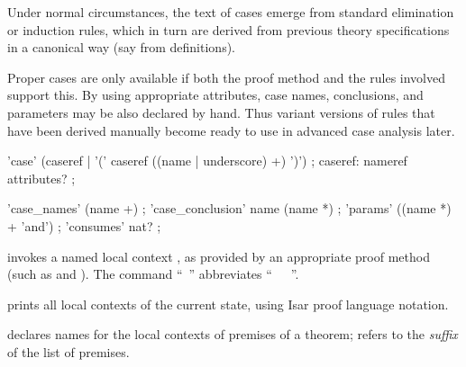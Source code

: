 \begin{isabellebody}
\begin{isamarkuptext}
  Under normal circumstances, the text of cases emerge from standard
  elimination or induction rules, which in turn are derived from
  previous theory specifications in a canonical way (say from
  \mbox{} definitions).

  \medskip Proper cases are only available if both the proof method
  and the rules involved support this.  By using appropriate
  attributes, case names, conclusions, and parameters may be also
  declared by hand.  Thus variant versions of rules that have been
  derived manually become ready to use in advanced case analysis
  later.

  \begin{rail}
    'case' (caseref | '(' caseref ((name | underscore) +) ')')
    ;
    caseref: nameref attributes?
    ;

    'case\_names' (name +)
    ;
    'case\_conclusion' name (name *)
    ;
    'params' ((name *) + 'and')
    ;
    'consumes' nat?
    ;
  \end{rail}

  \begin{descr}
  
  \item [\mbox{\isa{\isacommand{case}}}~\isa{{\isacharparenleft}c\ x\isactrlsub {\isadigit{1}}\ {\isasymdots}\ x\isactrlsub m{\isacharparenright}}]
  invokes a named local context , as provided by an appropriate
  proof method (such as \mbox{} and \mbox{}).
  The command ``\mbox{}~'' abbreviates ``\mbox{}~~\mbox{}~''.

  \item [\mbox{\isa{\isacommand{print{\isacharunderscore}cases}}}] prints all local contexts of the
  current state, using Isar proof language notation.
  
  \item [\mbox{\isa{case{\isacharunderscore}names}}~\isa{c\isactrlsub {\isadigit{1}}\ {\isasymdots}\ c\isactrlsub k}]
  declares names for the local contexts of premises of a theorem;
   refers to the \emph{suffix} of the
  list of premises.
  

\end{descr}
\end{isamarkuptext}
\end{isabellebody}
